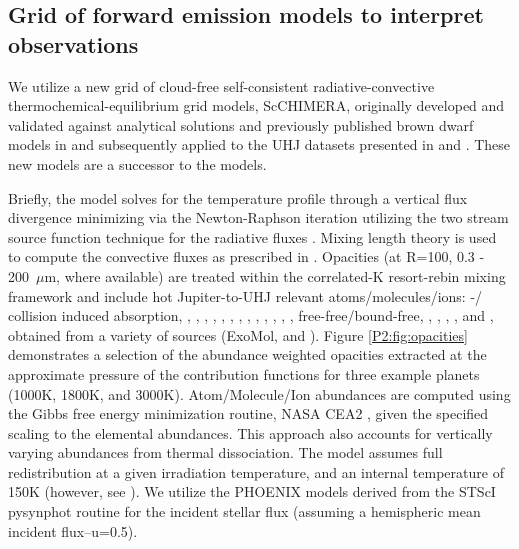 \subsection{Grid of forward emission models to interpret observations}
\label{P2:sec:models}
We utilize a new grid of cloud-free self-consistent radiative-convective thermochemical-equilibrium grid models, ScCHIMERA, originally developed and validated against analytical solutions and previously published brown dwarf models in \citet{Piskorz2018} and subsequently applied to the UHJ datasets presented in \citet{Arcangeli2018, Mansfield2018a} and \citet{Kreidberg2018b}. These new models are a successor to the \citet{Fortney2008} models.

Briefly, the model solves for the temperature profile through a vertical flux divergence minimizing via the Newton-Raphson iteration \citep{McKay1989} utilizing the two stream source function technique for the radiative fluxes \citep{Toon1989}. Mixing length theory is used to compute the convective fluxes as prescribed in \citet{Hubeny2017}.  Opacities (at R=100, 0.3 - 200~$\mu$m, where available) are treated within the correlated-K resort-rebin mixing framework \citep{Lacis1991, Amundsen2017} and include hot Jupiter-to-UHJ relevant atoms/molecules/ions: -/ collision induced absorption, , , , , , , , , , , , , ,  free-free/bound-free, , , , , and , obtained from a variety of sources (ExoMol, \citet{Freedman2008, Freedman2014} and \citet{Kurucz1995}). Figure \ref{P2:fig:opacities} demonstrates a selection of the abundance weighted opacities extracted at the approximate pressure of the \spitzer contribution functions for three example planets (1000K, 1800K, and 3000K). Atom/Molecule/Ion abundances are computed using the Gibbs free energy minimization routine, NASA CEA2 \citep{Gordon1994}, given the specified scaling to the \citet{Lodders2009a} elemental abundances. This approach also accounts for vertically varying abundances from thermal dissociation. The model assumes full redistribution at a given irradiation temperature, and an internal temperature of 150K (however, see \citet{Thorngren2019}). We utilize the PHOENIX \citep{Allard2011} models derived from the STScI pysynphot routine for the incident stellar flux (assuming a hemispheric mean incident flux--u=0.5).


